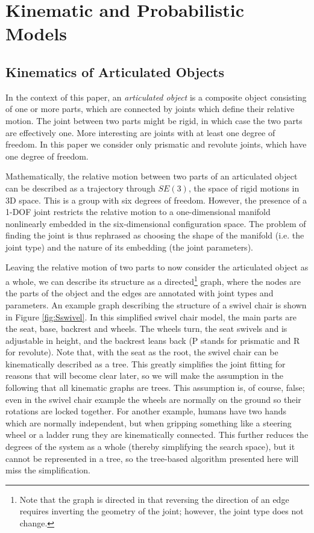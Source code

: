 \documentclass[letterpaper, 10 pt, conference]{ieeeconf}  %
\begin{document}
\section{Kinematic and Probabilistic Models} \label{sec:models}

\subsection{Kinematics of Articulated Objects}
In the context of this paper, an \emph{articulated object} is a composite object consisting of one or more parts, which are connected by joints which define their relative motion. The joint between two parts might be rigid, in which case the two parts are effectively one. More interesting are joints with at least one degree of freedom. In this paper we consider only prismatic and revolute joints, which have one degree of freedom.

Mathematically, the relative motion between two parts of an articulated object can be described as a trajectory through $SE(3)$, the space of rigid motions in 3D space. This is a group with six degrees of freedom. However, the presence of a 1-DOF joint restricts the relative motion to a one-dimensional manifold nonlinearly embedded in the six-dimensional configuration space. The problem of finding the joint is thus rephrased as choosing the shape of the manifold (i.e. the joint type) and the nature of its embedding (the joint parameters).

Leaving the relative motion of two parts to now consider the articulated object as a whole, we can describe its structure as a directed\footnote{Note that the graph is directed in that reversing the direction of an edge requires inverting the geometry of the joint; however, the joint type does not change.} graph, where the nodes are the parts of the object and the edges are annotated with joint types and parameters. An example graph describing the structure of a swivel chair is shown in Figure \ref{fig:Sswivel}. In this simplified swivel chair model, the main parts are the seat, base, backrest and wheels. The wheels turn, the seat swivels and is adjustable in height, and the backrest leans back (P stands for prismatic and R for revolute). Note that, with the seat as the root, the swivel chair can be kinematically described as a tree. This greatly simplifies the joint fitting for reasons that will become clear later, so we will make the assumption in the following that all kinematic graphs are trees. This assumption is, of course, false; even in the swivel chair example the wheels are normally on the ground so their rotations are locked together. For another example, humans have two hands which are normally independent, but when gripping something like a steering wheel or a ladder rung they are kinematically connected. This further reduces the degrees of the system as a whole (thereby simplifying the search space), but it cannot be represented in a tree, so the tree-based algorithm presented here will miss the simplification.
\end{document}
